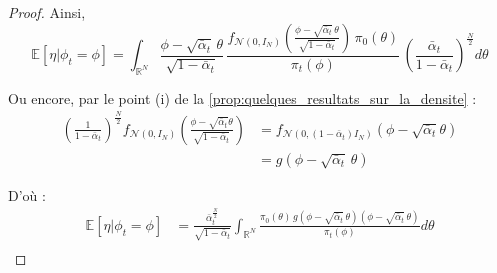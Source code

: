 \documentclass[a4paper,10pt]{article}
\theoremstyle{definition} %
\theoremstyle{definition} %
\theoremstyle{definition} %
\theoremstyle{definition} %
\newcommand{\E}[1]{\mathbb{E}\left[#1\right]}
\newcommand{\R}{\mathbb{R}}
\begin{document}
\begin{proof}
    Ainsi,
    \begin{equation*}
        \E{\eta|\phi_t = \phi} = \int_{\R^N} \frac{\phi-\sqrt{\bar \alpha_t}\,\theta}{\sqrt{1-\bar\alpha_t}}\, \frac{f_{\mathcal{N}(0,I_N)}\left(\frac{\phi-\sqrt{\bar \alpha_t}\,\theta}{\sqrt{1-\bar\alpha_t}}\right)\, \pi_0(\theta)}{\pi_t(\phi)}\,\left( \frac{\bar \alpha_t}{1-\bar\alpha_t}\right)^\frac{N}{2} d\theta
    \end{equation*}

    Ou encore, par le point (i) de la \cref{prop:quelques_resultats_sur_la_densite} :
    \begin{align*}
        \left( \frac{1}{1-\bar\alpha_t}\right)^\frac{N}{2}f_{\mathcal{N}(0,I_N)}\left(\frac{\phi-\sqrt{\bar \alpha_t}\theta}{\sqrt{1-\bar\alpha_t}}\right) &=  f_{\mathcal{N}(0,(1-\bar \alpha_t)I_N)}(\phi-\sqrt{\bar \alpha_t}\theta) \\
        &= g(\phi-\sqrt{\bar \alpha_t}\,\theta)
    \end{align*}

    D'où :
    \begin{align*}
        \E{\eta|\phi_t = \phi} &= \frac{\bar \alpha_t^{\frac{N}{2}}}{\sqrt{1-\bar\alpha_t}} \int_{\R^N} \frac{\pi_0(\theta)\, g(\phi - \sqrt{\bar \alpha_t} \,\theta)(\phi - \sqrt{\bar \alpha_t} \,\theta)}{\pi_t(\phi)} d\theta \\
    \end{align*}
    
\end{proof}
\end{document}
